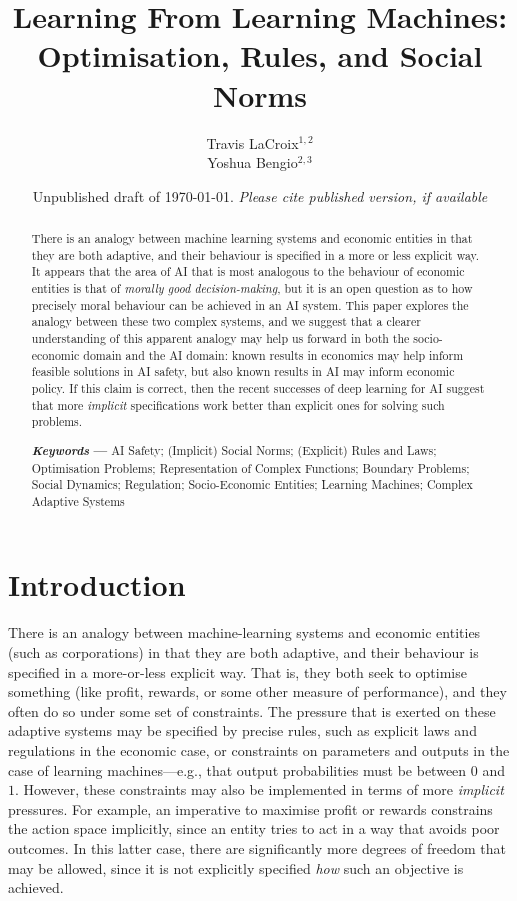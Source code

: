 \documentclass{amsart}
\title[Learning from Learning Machines]{Learning From Learning Machines: \\ Optimisation, Rules, and Social Norms}
\author[Travis LaCroix \& Yoshua Bengio]{Travis LaCroix$^{1,2}$ \\ Yoshua Bengio$^{2,3}$}
\date{Unpublished draft of \monthyeardate\today. {\it Please cite published version, if available}}
\theoremstyle{indented}
\theoremstyle{indentedProp}
\theoremstyle{indented}
\theoremstyle{indented}
\theoremstyle{indented}
\theoremstyle{indented}
\theoremstyle{indented}
\begin{document}
\maketitle

\begin{abstract}
\singlespacing
    There is an analogy between machine learning systems and economic entities in that they are both adaptive, and their behaviour is specified in a more or less explicit way. It appears that the area of AI that is most analogous to the behaviour of economic entities is that of {\it morally good decision-making}, but it is an open question as to how precisely moral behaviour can be achieved in an AI system. This paper explores the analogy between these two complex systems, and we suggest that a clearer understanding of this apparent analogy may help us forward in both the socio-economic domain and the AI domain: known results in economics may help inform feasible solutions in AI safety, but also known results in AI may inform economic policy. If this claim is correct, then the recent successes of deep learning for AI suggest that more {\it implicit} specifications work better than explicit ones for solving such problems. 
    
    \phantom{a}

    \noindent \textbf{\textit{Keywords} ---} AI Safety; (Implicit) Social Norms; (Explicit) Rules and Laws; Optimisation Problems; Representation of Complex Functions; Boundary Problems; Social Dynamics; Regulation; Socio-Economic Entities; Learning Machines; Complex Adaptive Systems \end{abstract}

\setcounter{page}{1}

\section{Introduction}
\label{sec:Introduction}

There is an analogy between machine-learning systems and economic entities (such as corporations) in that they are both adaptive, and their behaviour is specified in a more-or-less explicit way. That is, they both seek to optimise something (like profit, rewards, or some other measure of performance), and they often do so under some set of constraints. The pressure that is exerted on these adaptive systems may be specified by precise rules, such as explicit laws and regulations in the economic case, or constraints on parameters and outputs in the case of learning machines---e.g., that output probabilities must be between $0$ and $1$. However, these constraints may also be implemented in terms of more {\it implicit} pressures. For example, an imperative to maximise profit or rewards constrains the action space implicitly, since an entity tries to act in a way that avoids poor outcomes. In this latter case, there are significantly more degrees of freedom that may be allowed, since it is not explicitly specified {\it how} such an objective is achieved.
\end{document}
